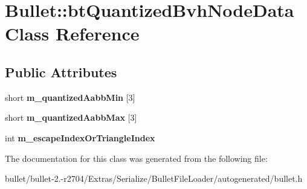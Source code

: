 \hypertarget{class_bullet_1_1bt_quantized_bvh_node_data}{\section{Bullet\+:\+:bt\+Quantized\+Bvh\+Node\+Data Class Reference}
\label{class_bullet_1_1bt_quantized_bvh_node_data}
}
\subsection*{Public Attributes}
\begin{DoxyCompactItemize}
\item 
\hypertarget{class_bullet_1_1bt_quantized_bvh_node_data_a4917a961466a57f1e4cddb2c80358e7f}{short {\bfseries m\+\_\+quantized\+Aabb\+Min} \mbox{[}3\mbox{]}}\label{class_bullet_1_1bt_quantized_bvh_node_data_a4917a961466a57f1e4cddb2c80358e7f}

\item 
\hypertarget{class_bullet_1_1bt_quantized_bvh_node_data_a119c7d5d5a325e66d1d5521d24fe0a24}{short {\bfseries m\+\_\+quantized\+Aabb\+Max} \mbox{[}3\mbox{]}}\label{class_bullet_1_1bt_quantized_bvh_node_data_a119c7d5d5a325e66d1d5521d24fe0a24}

\item 
\hypertarget{class_bullet_1_1bt_quantized_bvh_node_data_ae801a86703096ecd45ee7c0a29b4ea30}{int {\bfseries m\+\_\+escape\+Index\+Or\+Triangle\+Index}}\label{class_bullet_1_1bt_quantized_bvh_node_data_ae801a86703096ecd45ee7c0a29b4ea30}

\end{DoxyCompactItemize}


The documentation for this class was generated from the following file\+:\begin{DoxyCompactItemize}
\item 
bullet/bullet-\/2.-\/r2704/\+Extras/\+Serialize/\+Bullet\+File\+Loader/autogenerated/bullet.\+h\end{DoxyCompactItemize}
